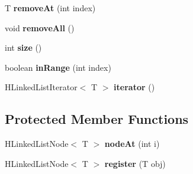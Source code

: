 \begin{DoxyCompactItemize}
\item 
\hypertarget{classhype_1_1collection_1_1_h_linked_list_3_01_t_01_4_a2ced2552bcb8dbcb22b04ddfc95bf3d4}{T {\bfseries remove\-At} (int index)}\label{classhype_1_1collection_1_1_h_linked_list_3_01_t_01_4_a2ced2552bcb8dbcb22b04ddfc95bf3d4}

\item 
\hypertarget{classhype_1_1collection_1_1_h_linked_list_3_01_t_01_4_afedfcd7b830164544cdd80f775cc1477}{void {\bfseries remove\-All} ()}\label{classhype_1_1collection_1_1_h_linked_list_3_01_t_01_4_afedfcd7b830164544cdd80f775cc1477}

\item 
\hypertarget{classhype_1_1collection_1_1_h_linked_list_3_01_t_01_4_aade26db170bf22eeca79dfcd73d44b67}{int {\bfseries size} ()}\label{classhype_1_1collection_1_1_h_linked_list_3_01_t_01_4_aade26db170bf22eeca79dfcd73d44b67}

\item 
\hypertarget{classhype_1_1collection_1_1_h_linked_list_3_01_t_01_4_a4ec40f06cf449af3f2f8d01246b18340}{boolean {\bfseries in\-Range} (int index)}\label{classhype_1_1collection_1_1_h_linked_list_3_01_t_01_4_a4ec40f06cf449af3f2f8d01246b18340}

\item 
\hypertarget{classhype_1_1collection_1_1_h_linked_list_3_01_t_01_4_a8bca0ca083ec7d62b0ec98cfe00c1461}{H\-Linked\-List\-Iterator$<$ T $>$ {\bfseries iterator} ()}\label{classhype_1_1collection_1_1_h_linked_list_3_01_t_01_4_a8bca0ca083ec7d62b0ec98cfe00c1461}

\end{DoxyCompactItemize}
\subsection*{Protected Member Functions}
\begin{DoxyCompactItemize}
\item 
\hypertarget{classhype_1_1collection_1_1_h_linked_list_3_01_t_01_4_af050ec3bed32ce3d059ec20114249aa3}{H\-Linked\-List\-Node$<$ T $>$ {\bfseries node\-At} (int i)}\label{classhype_1_1collection_1_1_h_linked_list_3_01_t_01_4_af050ec3bed32ce3d059ec20114249aa3}

\item 
\hypertarget{classhype_1_1collection_1_1_h_linked_list_3_01_t_01_4_ac58b60842325111db3ee4000d88c6161}{H\-Linked\-List\-Node$<$ T $>$ {\bfseries register} (T obj)}\label{classhype_1_1collection_1_1_h_linked_list_3_01_t_01_4_ac58b60842325111db3ee4000d88c6161}

\end{DoxyCompactItemize}
